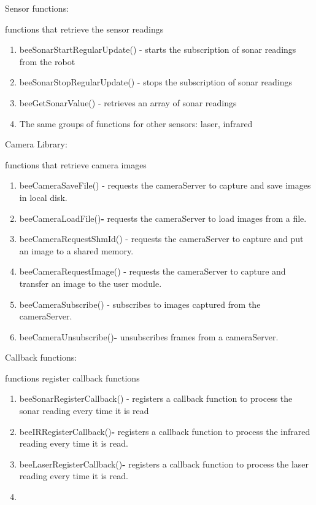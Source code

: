 {\begin{enumerate}
\end{enumerate}{\bf \par Sensor functions: }functions that retrieve
the sensor readings\par \begin{enumerate}\item
  beeSonarStartRegularUpdate() - starts the subscription of sonar
  readings from the robot\item  beeSonarStopRegularUpdate() -
  stops the subscription of sonar readings\item 
  beeGetSonarValue() - retrieves an array of sonar readings\item 
  The same groups of functions for other sensors: laser, infrared
\end{enumerate}{\bf \par Camera Library: }functions that retrieve
camera images\par \begin{enumerate}\item beeCameraSaveFile() -
  requests the cameraServer to capture and save images in local
  disk.\item  beeCameraLoadFile(){\bf - }requests the
  cameraServer to load images from a file.\item 
  beeCameraRequestShmId() - requests the cameraServer to capture and
  put an image to a shared memory.\item  beeCameraRequestImage()
  - requests the cameraServer to capture and transfer an image to the
  user module.\item  beeCameraSubscribe() - subscribes to images
  captured from the cameraServer.\item 
  beeCameraUnsubscribe(){\bf - }unsubscribes frames from a
  cameraServer. \end{enumerate}{\bf \par Callback functions:
  }functions register callback functions\par \begin{enumerate}\item
  beeSonarRegisterCallback() - registers a callback function to
  process the sonar reading every time it is read\item 
  beeIRRegisterCallback(){\bf - } registers a callback function to
  process the infrared reading every time it is read. \item 
  beeLaserRegisterCallback(){\bf - }registers a callback function to
  process the laser reading every time it is read.\item 

\end{enumerate}}
